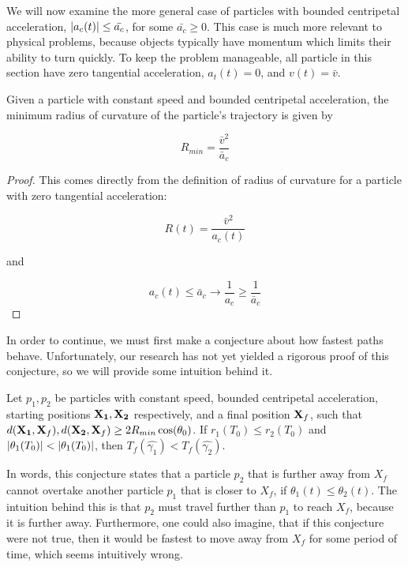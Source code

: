 We will now examine the more general case of particles with bounded centripetal acceleration, $\abs{a_c(t)} \le \bar{a_c}$, for some $\bar{a_c} \ge 0$. This case is much more relevant to physical problems, because objects typically have momentum which limits their ability to turn quickly. To keep the problem manageable, all particle in this section have zero tangential acceleration, $a_t(t) = 0$, and $v(t) = \bar{v}$.

\begin{lemma} \label{lem:r-curve}
  Given a particle with constant speed and bounded centripetal acceleration, the minimum radius of curvature of the particle's trajectory is given by

  \begin{equation}
    R_{min} = \frac{\bar{v}^2}{\bar{a}_c}
  \end{equation}
  \end{lemma}

\begin{proof}

This comes directly from the definition of radius of curvature for a particle with zero tangential acceleration:

\[
  R(t) = \frac{\bar{v}^2}{a_c(t)}
\]

and 

\[
  a_c(t) \le \bar{a}_c \to \frac{1}{a_c} \ge \frac{1}{\bar{a}_c}
\]
\end{proof}

In order to continue, we must first make a conjecture about how fastest paths behave. Unfortunately, our research has not yet yielded a rigorous proof of this conjecture, so we will provide some intuition behind it.

\begin{conjecture}\label{conj:optimal-position}
  Let $p_1, p_2$ be particles with constant speed, bounded centripetal acceleration, starting positions $\mathbf{X_1}, \mathbf{X_2}$ respectively, and a final position $\mathbf{X}_f$, such that $d(\bvec{X_1}, \bvec{X}_f), d(\bvec{X_2}, \bvec{X}_f) \ge 2 R_{min} \cos\paren{\theta_0}$. If $r_1(T_0) \leq r_2(T_0)$ and $\abs{\theta_1(T_0)} < \abs{\theta_1(T_0)}$, then $T_f(\hat{\gamma_1}) < T_f(\hat{\gamma_2})$.
\end{conjecture}

In words, this conjecture states that a particle $p_2$ that is further away from $X_f$ cannot overtake another particle $p_1$ that is closer to $X_f$, if $\theta_1(t) \le \theta_2(t)$. The intuition behind this is that $p_2$ must travel further than $p_1$ to reach $X_f$, because it is further away. Furthermore, one could also imagine, that if this conjecture were not true, then it would be fastest to move away from $X_f$ for some period of time, which seems intuitively wrong.

